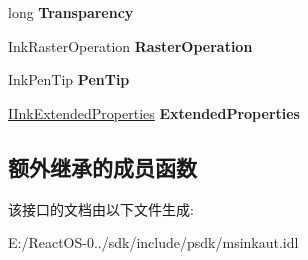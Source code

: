 \begin{DoxyCompactItemize}
\item 
\mbox{\label{interface_m_s_i_n_k_a_u_t_lib_1_1_i_ink_drawing_attributes_af6f8309ffa84a1e6fa0051e0b46b6fde}} 
long {\bfseries Transparency}
\item 
\mbox{\label{interface_m_s_i_n_k_a_u_t_lib_1_1_i_ink_drawing_attributes_a9ea93c7e1bc87bb3a44f8b0eb324953d}} 
Ink\+Raster\+Operation {\bfseries Raster\+Operation}
\item 
\mbox{\label{interface_m_s_i_n_k_a_u_t_lib_1_1_i_ink_drawing_attributes_a1b1ed8400df746ee744d8e366edfa5a0}} 
Ink\+Pen\+Tip {\bfseries Pen\+Tip}
\item 
\mbox{\label{interface_m_s_i_n_k_a_u_t_lib_1_1_i_ink_drawing_attributes_a8033eac15423a3030a106683d06a7e0e}} 
\hyperlink{interface_m_s_i_n_k_a_u_t_lib_1_1_i_ink_extended_properties}{I\+Ink\+Extended\+Properties} {\bfseries Extended\+Properties}
\end{DoxyCompactItemize}
\subsection*{额外继承的成员函数}


该接口的文档由以下文件生成\+:\begin{DoxyCompactItemize}
\item 
E\+:/\+React\+O\+S-\/0../sdk/include/psdk/msinkaut.\+idl\end{DoxyCompactItemize}
